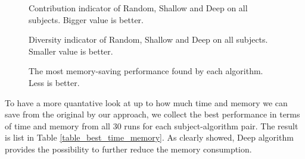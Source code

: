 \begin{figure}[htbp]
	\centering
	\caption{Contribution indicator of Random, Shallow and Deep on all subjects. Bigger value is better.}\label{fig_contribution}
\end{figure}

\begin{figure}[htb]
	\centering
	\caption{Diversity indicator of Random, Shallow and Deep on all subjects. Smaller value is better.}\label{fig_diversity}
\end{figure}

\begin{figure}[htb]
	\centering
	\caption{The most memory-saving performance found by each algorithm. Less is better.}\label{fig_best_memory}
\end{figure}

To have a more quantative look at up to how much time and memory we can save from the original by our approach, we collect the best performance in terms of time and memory from all 30 runs for each subject-algorithm pair. The result is list in Table \ref{table_best_time_memory}. As clearly showed, Deep algorithm provides the possibility to further reduce the memory consumption.

